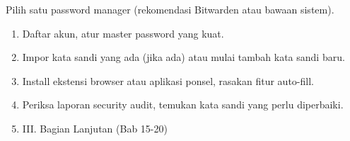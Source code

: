 \begin{tcbpractice}{Pilih satu password manager (rekomendasi Bitwarden atau bawaan sistem).}
\begin{enumerate}
  \item Daftar akun, atur master password yang kuat.
  \item Impor kata sandi yang ada (jika ada) atau mulai tambah kata sandi baru.
  \item Install ekstensi browser atau aplikasi ponsel, rasakan fitur auto-fill.
  \item Periksa laporan security audit, temukan kata sandi yang perlu diperbaiki.
  \item III. Bagian Lanjutan (Bab 15-20)
\end{enumerate}

\end{tcbpractice}
